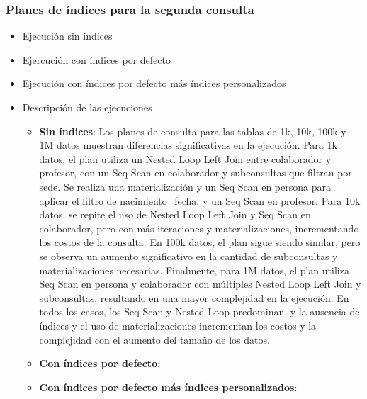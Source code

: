 \subsubsection{Planes de índices para la segunda consulta}
\begin{itemize}
      \item{Ejecución sin índices}
      \item{Ejercución con índices por defecto}
      \item{Ejecución con índices por defecto más índices personalizados}
      \item{Descripción de las ejecuciones}
      \begin{itemize}
            \item {\textbf{Sin índices}: Los planes de consulta para las tablas de 1k, 10k, 100k y 1M datos muestran diferencias significativas en la ejecución. Para 1k datos, el plan utiliza un Nested Loop Left Join entre colaborador y profesor, con un Seq Scan en colaborador y subconsultas que filtran por sede. Se realiza una materialización y un Seq Scan en persona para aplicar el filtro de nacimiento\_fecha, y un Seq Scan en profesor. Para 10k datos, se repite el uso de Nested Loop Left Join y Seq Scan en colaborador, pero con más iteraciones y materializaciones, incrementando los costos de la consulta. En 100k datos, el plan sigue siendo similar, pero se observa un aumento significativo en la cantidad de subconsultas y materializaciones necesarias. Finalmente, para 1M datos, el plan utiliza Seq Scan en persona y colaborador con múltiples Nested Loop Left Join y subconsultas, resultando en una mayor complejidad en la ejecución. En todos los casos, los Seq Scan y Nested Loop predominan, y la ausencia de índices y el uso de materializaciones incrementan los costos y la complejidad con el aumento del tamaño de los datos.}
            \item {\textbf{Con índices por defecto}: }
            \item {\textbf{Con índices por defecto más índices personalizados}: }
      \end{itemize}
\end{itemize}
